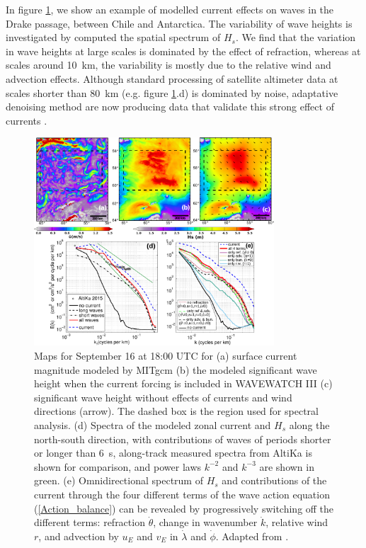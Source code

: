 In figure \ref{fig:Drake}, we show an example of modelled current effects on waves in the Drake passage, between Chile and Antarctica. 
The variability of wave heights is investigated by computed the spatial spectrum of $H_s$. We find that the 
variation in wave heights at large scales is dominated by the effect of refraction, whereas at scales around 10~km, 
the variability is mostly due to the relative wind and advection effects. Although standard processing of satellite altimeter data at scales shorter than 80~km (e.g. figure \ref{fig:Drake}.d) is dominated by noise, adaptative denoising method are now producing data that validate this strong effect of currents \citep{Quilfen&al.2018}. 

\begin{figure}[htb]
\centerline{\includegraphics[width=0.8\textwidth]{FIGS_CH_CURRENT/Drake.pdf}}
  \caption{Maps for September 16 at 18:00 UTC for  (a) surface current magnitude modeled by MITgcm (b) 
the modeled significant wave height when the current forcing is included 
in WAVEWATCH III (c) significant wave height without effects of currents and wind directions (arrow). The dashed box is the region used for spectral analysis. 
(d) Spectra of the modeled zonal current and $H_s$ along the north-south direction, 
with contributions of waves of periods shorter or longer than 6~s, along-track measured spectra from AltiKa is shown for comparison, and 
power laws $k^{-2}$ and $k^{-3}$ are shown in green. (e) Omnidirectional spectrum of $H_s$ and  contributions 
of the current through the four different terms of the wave action equation (\ref{Action_balance}) can be revealed by 
progressively switching off the different terms: refraction $\dot{\theta}$, change in wavenumber $\dot{k}$, relative wind $r$, 
and advection by $u_E$ and $v_E$ in $\dot{\lambda}$ and $\dot{\phi}$. Adapted from \cite{Ardhuin&al.2017a}.
}
\label{fig:Drake}
\end{figure}


